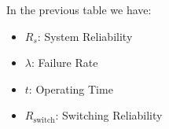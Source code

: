 \noindent
In the previous table we have:
\begin{itemize}
	\item $R_{s}$: System Reliability
	\item $\lambda$: Failure Rate
	\item $t$: Operating Time
	\item $R_{\text{switch}}$: Switching Reliability
\end{itemize}